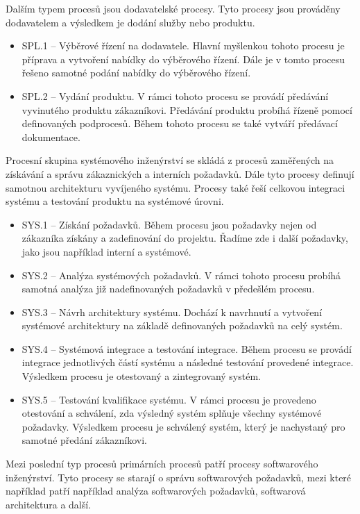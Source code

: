 \documentclass[czech,master,public,dept460,male,cpdeclaration,oneside]{diploma}
\begin{document}
Dalším typem procesů jsou dodavatelské procesy. Tyto procesy jsou prováděny dodavatelem a výsledkem je dodání služby nebo produktu.

\begin{itemize}
	\item SPL.1 -- Výběrové řízení na dodavatele. Hlavní myšlenkou tohoto procesu je příprava a vytvoření nabídky do výběrového řízení.  Dále je v tomto procesu řešeno samotné podání nabídky do výběrového řízení.
	\item SPL.2 -- Vydání produktu. V rámci tohoto procesu se provádí předávání vyvinutého produktu zákazníkovi. Předávání produktu probíhá řízeně pomocí definovaných podprocesů. Během tohoto procesu se také vytváří předávací dokumentace. 
\end{itemize}	

Procesní skupina systémového inženýrství se skládá z procesů zaměřených na získávání a správu zákaznických a interních požadavků. Dále tyto procesy definují samotnou architekturu vyvíjeného systému. Procesy také řeší celkovou integraci systému a testování produktu na systémové úrovni.

\begin{itemize}
	\item SYS.1 -- Získání požadavků. Během procesu jsou požadavky nejen od zákazníka získány a zadefinování do projektu. Řadíme zde i další požadavky, jako jsou například interní a systémové. 
	\item SYS.2 -- Analýza systémových požadavků. V rámci tohoto procesu probíhá samotná analýza již nadefinovaných požadavků v předešlém procesu.
	\item SYS.3 -- Návrh architektury systému. Dochází k navrhnutí a vytvoření systémové architektury na základě definovaných požadavků na celý systém.
	\item SYS.4 -- Systémová integrace a testování integrace. Během procesu se provádí integrace jednotlivých částí systému a následné testování provedené integrace. Výsledkem procesu je otestovaný a zintegrovaný systém.
	\item SYS.5 -- Testování kvalifikace systému. V rámci procesu je provedeno otestování a schválení, zda výsledný systém splňuje všechny systémové požadavky. Výsledkem procesu je schválený systém, který je nachystaný pro samotné předání zákazníkovi.
\end{itemize}

Mezi poslední typ procesů primárních procesů patří procesy softwarového inženýrství. Tyto procesy se starají o správu softwarových požadavků, mezi které například patří například analýza softwarových požadavků, softwarová architektura a další.
\end{document}
